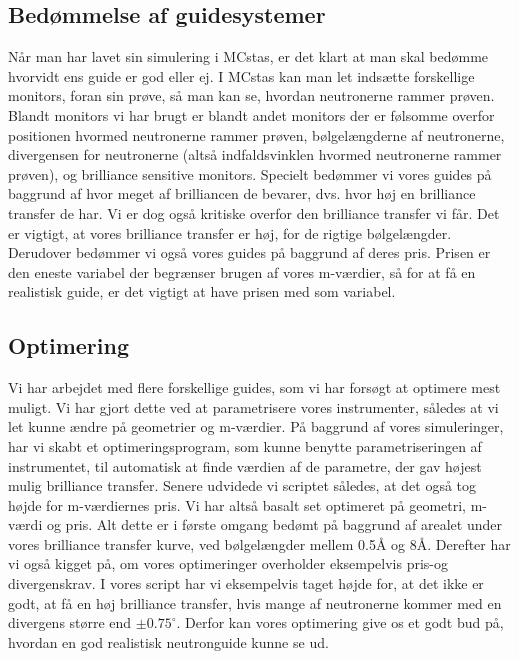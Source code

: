\documentclass[12pt,oneside,a4paper]{article}
\begin{document}
{{{{{\subsection{Bedømmelse af guidesystemer}

Når man har lavet sin simulering i MCstas, er det klart at man skal bedømme hvorvidt ens guide er god eller ej. I MCstas kan man let indsætte forskellige monitors, foran sin prøve, så man kan se, hvordan neutronerne rammer prøven. Blandt monitors vi har brugt er blandt andet monitors der er følsomme overfor positionen hvormed neutronerne rammer prøven, bølgelængderne af neutronerne, divergensen for neutronerne (altså indfaldsvinklen hvormed neutronerne rammer prøven), og brilliance sensitive monitors. Specielt bedømmer vi vores guides på baggrund af hvor meget af brilliancen de bevarer, dvs. hvor høj en brilliance transfer de har. Vi er dog også kritiske overfor den brilliance transfer vi får. Det er vigtigt, at vores brilliance transfer er høj, for de rigtige bølgelængder. Derudover bedømmer vi også vores guides på baggrund af deres pris. Prisen er den eneste variabel der begrænser brugen af vores m-værdier, så for at få en realistisk guide, er det vigtigt at have prisen med som variabel.


\subsection{Optimering}
Vi har arbejdet med flere forskellige guides, som vi har forsøgt at optimere mest muligt. Vi har gjort dette ved at parametrisere vores instrumenter, således at vi let kunne ændre på geometrier og m-værdier. På baggrund af vores simuleringer, har vi skabt et optimeringsprogram, som kunne benytte parametriseringen af instrumentet, til automatisk at finde værdien af de parametre, der gav højest mulig brilliance transfer. Senere udvidede vi scriptet således, at det også tog højde for m-værdiernes pris. Vi har altså basalt set optimeret på geometri, m-værdi og pris. Alt dette er i første omgang bedømt på baggrund af arealet under vores brilliance transfer kurve, ved bølgelængder mellem 0.5Å og 8Å. Derefter har vi også kigget på, om vores optimeringer overholder eksempelvis pris-og divergenskrav. I vores script har vi eksempelvis taget højde for, at det ikke er godt, at få en høj brilliance transfer, hvis mange af neutronerne kommer med en divergens større end $\pm0.75^\circ$. Derfor kan vores optimering give os et godt bud på, hvordan en god realistisk neutronguide kunne se ud. 


}}}}}
\end{document}
